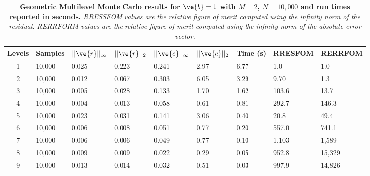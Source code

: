 \documentclass[note]{TechNote}
\begin{document}
\begin{table}[h!]
  \begin{center}
    \begin{tabular}{cllllllll}\hline\hline
      \multicolumn{1}{c}{\textbf{Levels}} &
      \multicolumn{1}{l}{\textbf{Samples}} &
      \multicolumn{1}{l}{\textbf{$||\ve{r}||_{\infty}$}} &
      \multicolumn{1}{l}{\textbf{$||\ve{r}||_{2}$}} &
      \multicolumn{1}{l}{\textbf{$||\ve{e}||_{\infty}$}} &
      \multicolumn{1}{l}{\textbf{$||\ve{e}||_{2}$}} &
      \multicolumn{1}{l}{\textbf{Time (s)}} &
      \multicolumn{1}{l}{\textbf{RRESFOM}} &
      \multicolumn{1}{l}{\textbf{RERRFOM}} \\
      \hline
      1 & 10,000 & 0.025 & 0.223 & 0.241 & 2.97 & 6.77 & 1.0 & 1.0 \\
      2 & 10,000 & 0.012 & 0.067 & 0.303 & 6.05 & 3.29 & 9.70 & 1.3 \\
      3 & 10,000 & 0.005 & 0.028 & 0.133 & 1.70 & 1.62 & 103.6 & 13.7 \\
      4 & 10,000 & 0.004 & 0.013 & 0.058 & 0.61 & 0.81 & 292.7 & 146.3 \\
      5 & 10,000 & 0.023 & 0.031 & 0.141 & 3.06 & 0.40 & 20.8 & 49.4 \\
      6 & 10,000 & 0.006 & 0.008 & 0.051 & 0.77 & 0.20 & 557.0 & 741.1 \\
      7 & 10,000 & 0.006 & 0.006 & 0.049 & 0.77 & 0.10 & 1,103 & 1,589 \\
      8 & 10,000 & 0.009 & 0.009 & 0.022 & 0.29 & 0.05 & 952.8 & 15,329 \\
      9 & 10,000 & 0.013 & 0.014 & 0.032 & 0.51 & 0.03 & 997.9 &
      14,826 \\
      \hline\hline
    \end{tabular}
  \end{center}
  \caption{\textbf{Geometric Multilevel Monte Carlo results for
      $\ve{b} = 1$ with $M = 2$, $N = 10,000$ and run times reported
      in seconds.} \textit{RRESSFOM values are the relative figure of
      merit computed using the infinity norm of the residual. RERRFORM
    values are the relative figure of merit computed using the
    infinity norm of the absolute error vector.}}
  \label{tab:heterogeneous_cg_solutions}
\end{table}
\end{document}

